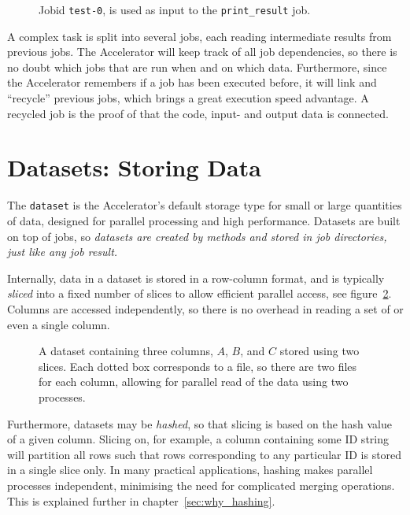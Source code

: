 \begin{figure}[h!]
  \begin{center}
    
    \caption{Jobid \texttt{test-0}, is used as input to the
      \texttt{print\_result} job.}
    \label{fig:execflow-print-result}
  \end{center}
\end{figure}

A complex task is split into several jobs, each reading intermediate
results from previous jobs.  The Accelerator will keep track of all
job dependencies, so there is no doubt which jobs that are run when
and on which data.  Furthermore, since the Accelerator remembers if a
job has been executed before, it will link and ``recycle'' previous
jobs, which brings a great execution speed advantage.  A recycled job
is the proof of that the code, input- and output data is connected.


\section{Datasets: Storing Data}

The \texttt{dataset} is the Accelerator's default storage type for
small or large quantities of data, designed for parallel processing
and high performance.  Datasets are built on top of jobs, so
\emph{datasets are created by methods and stored in job directories,
  just like any job result.}

Internally, data in a dataset is stored in a row-column format, and is
typically \emph{sliced} into a fixed number of slices to allow
efficient parallel access, see figure~\ref{fig:dataset}. Columns are
accessed independently, so there is no overhead in reading a set of or
even a single column.


\begin{figure}[h!]
  \begin{center}
    
    \caption{A dataset containing three columns, $A$, $B$, and $C$
      stored using two slices.  Each dotted box corresponds to a file,
      so there are two files for each column, allowing for parallel
      read of the data using two processes.}
    \label{fig:dataset}
  \end{center}
\end{figure}

Furthermore, datasets may be \textsl{hashed}, so that slicing is based
on the hash value of a given column.  Slicing on, for example, a
column containing some ID string will partition all rows such that
rows corresponding to any particular ID is stored in a single slice
only.  In many practical applications, hashing makes parallel
processes independent, minimising the need for complicated merging
operations.  This is explained further in chapter~\ref{sec:why_hashing}.



